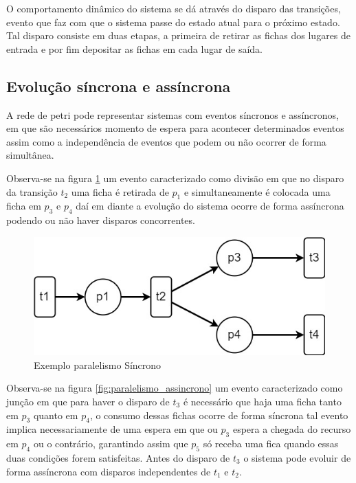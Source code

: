 O comportamento dinâmico do sistema se dá através do disparo das transições, evento que faz com que o sistema passe do estado atual para o próximo estado. Tal disparo consiste em duas etapas, a primeira de retirar as fichas dos lugares de entrada e por fim depositar as fichas em cada lugar de saída.

\subsection{Evolução síncrona e assíncrona}
A rede de petri pode representar sistemas com eventos síncronos e assíncronos, em que são necessários momento de espera para acontecer determinados eventos assim como a independência de eventos que podem ou não ocorrer de forma simultânea.

Observa-se na figura \ref{fig:paralelismo_sincrono} um evento caracterizado como divisão em que no disparo da transição $t_2$ uma ficha é retirada de $p_1$ e simultaneamente é colocada uma ficha em $p_3$ e $p_4$ daí em diante a evolução do sistema ocorre de forma assíncrona podendo ou não haver disparos concorrentes.  

\begin{figure}[h]
    \centering
    \includegraphics[scale=0.4]{figures/Petri/paralelismo_sincrono.jpg}
    \caption{Exemplo paralelismo Síncrono} 
    \label{fig:paralelismo_sincrono}
\end{figure}

Observa-se na figura \ref{fig:paralelismo_assincrono} um evento caracterizado como junção em que para haver o disparo de $t_3$ é necessário que haja uma ficha tanto em $p_3$ quanto em $p_4$, o consumo dessas fichas ocorre de forma síncrona tal evento implica necessariamente de uma espera em que ou $p_3$ espera a chegada do recurso em $p_4$ ou o contrário, garantindo assim que $p_5$ só receba uma fica quando essas duas condições forem satisfeitas. Antes do disparo de $t_3$ o sistema pode evoluir de forma assíncrona com disparos independentes de $t_1$ e $t_2$.


